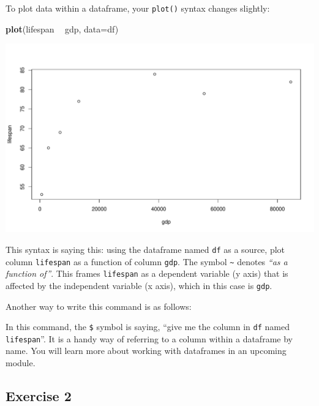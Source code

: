 \documentclass[
]{book}
\newenvironment{Shaded}{\begin{snugshade}}{\end{snugshade}}
\newcommand{\DataTypeTok}[1]{\textcolor[rgb]{0.13,0.29,0.53}{#1}}
\newcommand{\KeywordTok}[1]{\textcolor[rgb]{0.13,0.29,0.53}{\textbf{#1}}}
\newcommand{\NormalTok}[1]{#1}
\newcommand{\OperatorTok}[1]{\textcolor[rgb]{0.81,0.36,0.00}{\textbf{#1}}}
\newcommand{\StringTok}[1]{\textcolor[rgb]{0.31,0.60,0.02}{#1}}
\begin{document}
To plot data within a dataframe, your \texttt{plot()} syntax changes slightly:

\begin{Shaded}
\begin{Highlighting}[]
\KeywordTok{plot}\NormalTok{(lifespan }\OperatorTok{~}\StringTok{ }\NormalTok{gdp, }\DataTypeTok{data=}\NormalTok{df)}
\end{Highlighting}
\end{Shaded}

\includegraphics{figures/unnamed-chunk-101-1.pdf}

This syntax is saying this: using the dataframe named \texttt{df} as a source, plot column \texttt{lifespan} as a function of column \texttt{gdp}. The symbol \texttt{\textasciitilde{}} denotes \emph{``as a function of''}. This frames \texttt{lifespan} as a dependent variable (y axis) that is affected by the independent variable (x axis), which in this case is \texttt{gdp}.

Another way to write this command is as follows:

\begin{Shaded}
\end{Shaded}

In this command, the \texttt{\$} symbol is saying, ``give me the column in \texttt{df} named \texttt{lifespan}''. It is a handy way of referring to a column within a dataframe by name. You will learn more about working with dataframes in an upcoming module.

\hypertarget{exercise-2-3}{%
\subsection*{Exercise 2}\label{exercise-2-3}}
\end{document}
